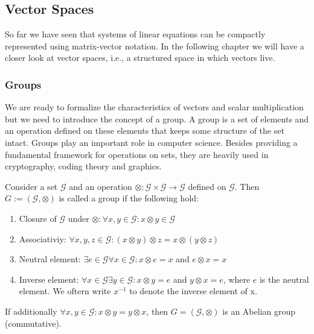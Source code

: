 \subsection*{Vector Spaces}
So far we have seen that systems of linear equations can be compactly represented using matrix-vector notation. In the following chapter we will have a closer look at vector spaces, i.e., a structured space in which vectors live.
\subsubsection*{Groups}
We are ready to formalize the characteristics of vectors and scalar multiplication but we need to introduce the concept of a group. A group is a set of elements and an operation defined on these elements that keeps some structure of the set intact.
Groups play an important role in computer science. Besides providing a fundamental framework for operations on sets, they are heavily used in cryptography, coding theory and graphics.
\begin{definition}[Group]
    Consider a set $\mathcal{G}$ and an operation $\otimes: \mathcal{G} \times \mathcal{G} \rightarrow \mathcal{G}$ defined on $\mathcal{G}$. Then $G:=(\mathcal{G},\otimes)$ is called a group if the following hold:
    \begin{enumerate}
        \item Closure of $\mathcal{G}$ under $\otimes: \forall x,y \in \mathcal{G}: x\otimes y \in \mathcal{G}$
        \item Associativiy: $\forall x,y,z \in \mathcal{G}: (x\otimes y) \otimes z = x \otimes(y \otimes z)$
        \item Neutral element: $\exists e \in \mathcal{ G} \forall x \in \mathcal{G} : x\otimes e = x$ and $e \otimes x =x$
        \item Inverse element: $\forall x \in \mathcal{G} \exists y\in \mathcal{G}: x\otimes y = e$ and $y\otimes x = e$, where $e$ is the neutral element. We oftern write $x^{-1}$ to denote the inverse element of x.
    \end{enumerate}
\end{definition}
\begin{remark}
    If additionally $\forall x,y \in \mathcal{G}: x\otimes y = y\otimes x$, then $G = (\mathcal{G,\otimes})$ is an Abelian group (commutative).
\end{remark}
